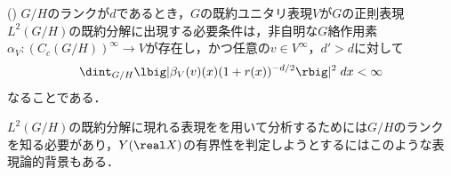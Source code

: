 \begin{thm*}(\cite[pp.~665--6]{ber88})\label{thm:plancherel}
  $G/H$のランクが$d$であるとき，$G$の既約ユニタリ表現$V$が$G$の正則表現$L^2(G/H)$の既約分解に出現する必要条件は，非自明な$G$絡作用素$\alpha_V\colon (C_c(G/H))^{\infty}\to V $が存在し，かつ任意の$v\in V^{\infty} $，$d' > d$に対して
  \begin{align}
    \dint_{G/H}\lbig|\beta_V(v)(x)(1+r(x))^{-d/2} \rbig|^2\; dx < \infty\label{eq:ber88}
  \end{align}
  なることである．%
\end{thm*}

$L^2(G/H)$の既約分解に現れる表現をを用いて分析するためには$G/H$のランクを知る必要があり，$Y(\real X) $の有界性を判定しようとするにはこのような表現論的背景もある．
